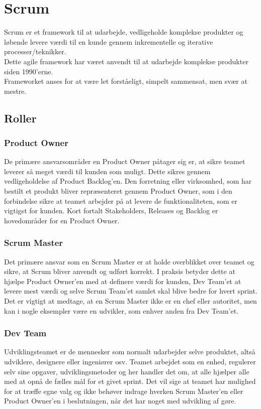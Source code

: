 \section{Scrum}\label{sec:scrum}
Scrum er et framework til at udarbejde, vedligeholde komplekse produkter og løbende levere 
værdi til en kunde gennem inkrementelle og iterative processer/teknikker. \\

Dette agile framework har været anvendt til at udarbejde komplekse produkter siden 1990’erne. \\

Frameworket anses for at være let forståeligt, simpelt sammensat, men svær at mestre.

\subsection{Roller}
\subsubsection{Product Owner}
De primære ansvarsområder en Product Owner påtager sig er, at sikre teamet leverer så 
meget værdi til kunden som muligt. Dette sikres gennem vedligeholdelse af Product Backlog’en. 
Den forretning eller virksomhed, som har bestilt et produkt bliver repræsenteret gennem 
Product Owner, som i den forbindelse sikre at teamet arbejder på at levere de funktionaliteten, 
som er vigtigst for kunden. Kort fortalt Stakeholders, Releases og Backlog er hovedområder for en Product Owner.

\subsubsection{Scrum Master}
Det primære ansvar som en Scrum Master er at holde overblikket over teamet og sikre, at Scrum bliver anvendt 
og udført korrekt. I praksis betyder dette at hjælpe Product Owner’en med at definere værdi for kunden, 
Dev Team’et at levere mest værdi og selve Scrum Team’et samlet skal blive bedre for hvert sprint. 
Det er vigtigt at medtage, at en Scrum Master ikke er en chef eller autoritet, men kan i nogle eksempler 
være en udvikler, som enhver anden fra Dev Team’et.

\subsubsection{Dev Team}
Udviklingsteamet er de mennesker som normalt udarbejder selve produktet, altså udviklere, designere 
eller ingeniører osv. Teamet arbejdet som en enhed, regulerer selv sine opgaver, udviklingsmetoder og 
her handler det om, at alle hjælper alle med at opnå de fælles mål for et givet sprint. Det vil sige 
at teamet har mulighed for at træffe egne valg og ikke behøver indrage hverken Scrum Master’en eller 
Product Owner’en i beslutningen, når det har noget med udvikling af gøre.


